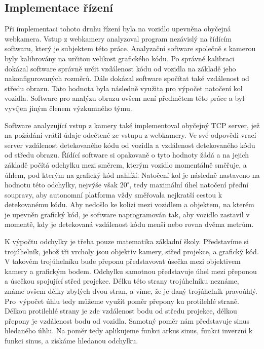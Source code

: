 \documentclass[czech, bachelor]{diploma}
\begin{document}
\subsection{Implementace řízení}

Při implementaci tohoto druhu řízení byla na vozidlo upevněna obyčejná webkamera. Vstup z webkamery analyzoval program nezávislý
na řídícím softwaru, který je subjektem této práce. Analyzační software společně s kamerou byly kalibrovány na určitou velikost
grafického kódu. Po správné kalibraci dokázal software správně určit vzdálenost kódu od vozidla na základě jeho nakonfigurovaných
rozměrů. Dále dokázal software spočítat také vzdálenost od středu obrazu. Tato hodnota byla následně využita pro výpočet natočení
kol vozidla. Software pro analýzu obrazu ovšem není předmětem této práce a byl vyvíjen jiným členem výzkumného týmu.

Software analyzující vstup z kamery také implementoval obyčejný TCP server, jež na požádání vrátil údaje odečtené ze vstupu
z webkamery. Ve své odpovědi vrací server vzdálenost detekovaného kódu od vozidla a vzdálenost detekovaného kódu od středu obrazu.
Řídící software si opakovaně o tyto hodnoty žádá a na jejich základě počítá odchylku mezi směrem, kterým vozidlo momentálně
směřuje, a úhlem, pod kterým na grafický kód nahlíží. Natočení kol je následně nastaveno na hodnotu této odchylky, nejvýše však
$20^{\circ}$, tedy maximální úhel natočení přední soupravy, aby autonomní platforma vždy směřovala nejkratší cestou k detekovanému
kódu. Aby nedošlo ke kolizi mezi vozidlem a objektem, na kterém je upevněn grafický kód, je software naprogramován tak, aby
vozidlo zastavil v momentě, kdy je detekovaná vzdálenost kódu menší nebo rovna dvěma metrům.

K výpočtu odchylky je třeba pouze matematika základní školy. Představíme si trojúhelník, jehož tři vrcholy jsou objektiv kamery,
střed projekce, a grafický kód. V takovém trojúhelníku bude přeponu představovat úsečka mezi objektivem kamery a grafickým bodem.
Odchylku samotnou představuje úhel mezi přeponou a úsečkou spojující střed projekce. Délku této strany trojúhelníku neznáme, známe
ovšem délky zbylých dvou stran, a víme, že je daný trojúhelník pravoúhlý. Pro~výpočet úhlu tedy můžeme využít poměr přepony ku
protilehlé straně. Délkou protilehlé strany je zde vzdálenost bodu od středu projekce, délkou přepony je vzdálenost bodu
od vozidla. Samotný poměr nám představuje sinus hledaného úhlu. Na poměr tedy aplikujeme funkci arkus sinus, funkci inverzní k
funkci sinus, a získáme hledanou odchylku.
\end{document}
